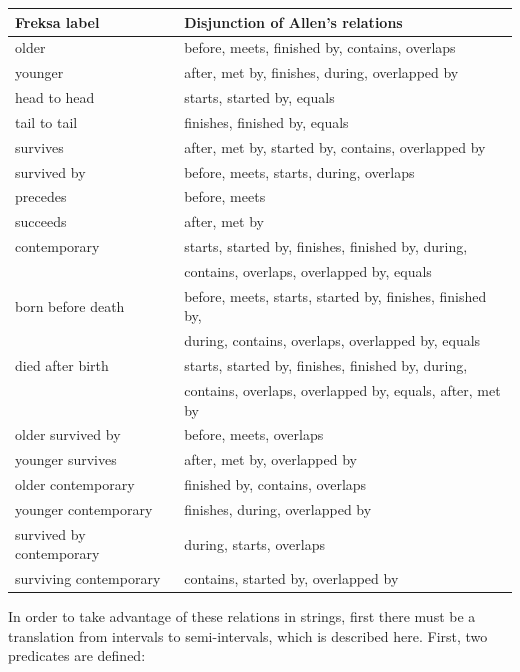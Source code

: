 \documentclass[a4paper,12pt,leqno]{article}
\begin{document}
\begin{center}
	\begin{tabular}[]{|l l|}
		\hline
		\textbf{Freksa label} & \textbf{Disjunction of Allen's relations}\\
		\hline
		older & before, meets, finished by, contains, overlaps\\
		younger & after, met by, finishes, during, overlapped by\\
		head to head & starts, started by, equals\\
		tail to tail & finishes, finished by, equals\\
		survives & after, met by, started by, contains, overlapped by\\
		survived by & before, meets, starts, during, overlaps\\
		precedes & before, meets\\
		succeeds & after, met by\\
		contemporary & starts, started by, finishes, finished by, during,\\ & contains, overlaps, overlapped by, equals\\
		born before death & before, meets, starts, started by, finishes, finished by,\\ & during, contains, overlaps, overlapped by, equals\\
		died after birth & starts, started by, finishes, finished by, during,\\ & contains, overlaps, overlapped by, equals, after, met by\\
		older survived by & before, meets, overlaps\\
		younger survives & after, met by, overlapped by\\
		older contemporary & finished by, contains, overlaps\\
		younger contemporary & finishes, during, overlapped by\\
		survived by contemporary & during, starts, overlaps\\
		surviving contemporary & contains, started by, overlapped by\\
		\hline
	\end{tabular}
	\label{tab:freksa-disjunctions}
\end{center}
In order to take advantage of these relations in strings, first there must be a translation from intervals to semi-intervals, which is described here. First, two predicates are defined:
\end{document}

